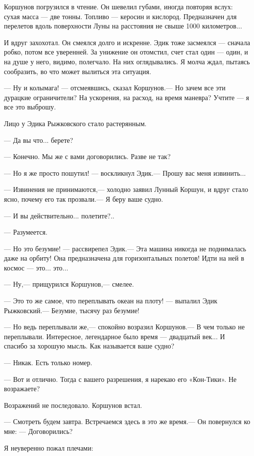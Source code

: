 \documentclass[11pt,a4paper,oneside]{article}
\begin{document}
Коршунов погрузился в чтение. Он шевелил губами, иногда повторяя вслух: сухая масса — две тонны. Топливо — керосин и кислород. Предназначен для перелетов вдоль поверхности Луны на расстояния не свыше 1000 километров...

И вдруг захохотал. Он смеялся долго и искренне. Эдик тоже засмеялся — сначала робко, потом все уверенней. За унижение он отомстил, счет стал один — один, и на душе у него, видимо, полегчало. На них оглядывались. Я молча ждал, пытаясь сообразить, во что может вылиться эта ситуация.

— Ну и колымага! — отсмеявшись, сказал Коршунов.— Но зачем все эти дурацкие ограничители? На ускорения, на расход, на время маневра? Учтите — я все это выброшу.

Лицо у Эдика Рыжковского стало растерянным.

— Да вы что... берете?

— Конечно. Мы же с вами договорились. Разве не так?

— Но я же просто пошутил! — воскликнул Эдик.— Прошу вас меня извинить...

— Извинения не принимаются,— холодно заявил Лунный Коршун, и вдруг стало ясно, почему его так прозвали.— Я беру ваше судно.

— И вы действительно... полетите?..

— Разумеется.

— Но это безумие! — рассвирепел Эдик.— Эта машина никогда не поднималась даже на орбиту! Она предназначена для горизонтальных полетов! Идти на ней в космос — это... это...

— Ну,— прищурился Коршунов,— смелее.

— Это то же самое, что переплывать океан на плоту! — выпалил Эдик Рыжковский.— Безумие, тысячу раз безумие!

— Но ведь переплывали же,— спокойно возразил Коршунов.— В чем только не переплывали. Интересное, легендарное было время — двадцатый век... И спасибо за хорошую мысль. Как называется ваше судно?

— Никак. Есть только номер.

— Вот и отлично. Тогда с вашего разрешения, я нарекаю его «Кон-Тики». Не возражаете?

Возражений не последовало. Коршунов встал.

— Смотреть будем завтра. Встречаемся здесь в это же время.— Он повернулся ко мне: — Договорились?

Я неуверенно пожал плечами:
\end{document}
